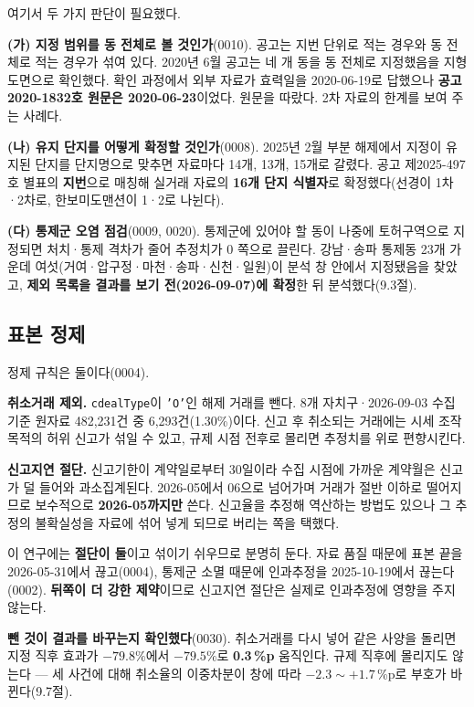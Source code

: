 여기서 두 가지 판단이 필요했다.

\textbf{(가) 지정 범위를 동 전체로 볼 것인가}(0010). 공고는 지번 단위로 적는
경우와 동 전체로 적는 경우가 섞여 있다. 2020년 6월 공고는 네 개 동을 동 전체로
지정했음을 지형도면으로 확인했다. 확인 과정에서 외부 자료가 효력일을
2020-06-19로 답했으나 \textbf{공고 2020-1832호 원문은 2020-06-23}이었다. 원문을
따랐다. 2차 자료의 한계를 보여 주는 사례다.

\textbf{(나) 유지 단지를 어떻게 확정할 것인가}(0008). 2025년 2월 부분 해제에서
지정이 유지된 단지를 단지명으로 맞추면 자료마다 14개, 13개, 15개로 갈렸다.
공고 제2025-497호 별표의 \textbf{지번}으로 매칭해 실거래 자료의
\textbf{16개 단지 식별자}로 확정했다(선경이 1차·2차로, 한보미도맨션이 1·2로
나뉜다).

\textbf{(다) 통제군 오염 점검}(0009, 0020). 통제군에 있어야 할 동이 나중에
토허구역으로 지정되면 처치·통제 격차가 줄어 추정치가 0 쪽으로 끌린다. 강남·송파
통제동 23개 가운데 여섯(거여·압구정·마천·송파·신천·일원)이 분석 창 안에서
지정됐음을 찾았고, \textbf{제외 목록을 결과를 보기 전(2026-09-07)에 확정}한 뒤
분석했다(9.3절).

\subsection{표본 정제}

정제 규칙은 둘이다(0004).

\textbf{취소거래 제외.} \texttt{cdealType}이 \texttt{'O'}인 해제 거래를 뺀다.
8개 자치구·2026-09-03 수집 기준 원자료 482,231건 중 6,293건(1.30\%)이다. 신고 후
취소되는 거래에는 시세 조작 목적의 허위 신고가 섞일 수 있고, 규제 시점 전후로
몰리면 추정치를 위로 편향시킨다.

\textbf{신고지연 절단.} 신고기한이 계약일로부터 30일이라 수집 시점에 가까운
계약월은 신고가 덜 들어와 과소집계된다. 2026-05에서 06으로 넘어가며 거래가 절반
이하로 떨어지므로 보수적으로 \textbf{2026-05까지만} 쓴다. 신고율을 추정해
역산하는 방법도 있으나 그 추정의 불확실성을 자료에 섞어 넣게 되므로 버리는 쪽을
택했다.

이 연구에는 \textbf{절단이 둘}이고 섞이기 쉬우므로 분명히 둔다. 자료 품질 때문에
표본 끝을 2026-05-31에서 끊고(0004), 통제군 소멸 때문에 인과추정을
2025-10-19에서 끊는다(0002). \textbf{뒤쪽이 더 강한 제약}이므로 신고지연 절단은
실제로 인과추정에 영향을 주지 않는다.

\textbf{뺀 것이 결과를 바꾸는지 확인했다}(0030). 취소거래를 다시 넣어 같은 사양을
돌리면 지정 직후 효과가 $-79.8\%$에서 $-79.5\%$로 \textbf{0.3\,\%p} 움직인다.
규제 직후에 몰리지도 않는다 --- 세 사건에 대해 취소율의 이중차분이 창에 따라
$-2.3 \sim +1.7$\,\%p로 부호가 바뀐다(9.7절).

